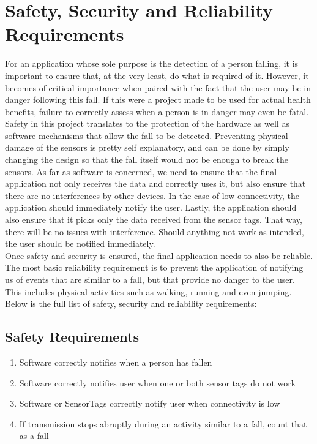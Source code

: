 \documentclass[conference,12pt]{IEEETran}
\begin{document}
\section{Safety, Security and Reliability Requirements}
	For an application whose sole purpose is the detection of a person falling, it is important to ensure that, at the very least, do what is required of it. However, it becomes of critical importance when paired with the fact that the user may be in danger following this fall. If this were a project made to be used for actual health benefits, failure to correctly assess when a person is in danger may even be fatal. Safety in this project translates to the protection of the hardware as well as software mechanisms that allow the fall to be detected. Preventing physical damage of the sensors is pretty self explanatory, and can be done by simply changing the design so that the fall itself would not be enough to break the sensors. As far as software is concerned, we need to ensure that the final application not only receives the data and correctly uses it, but also ensure that there are no interferences by other devices. In the case of low connectivity, the application should immediately notify the user. Lastly, the application should also ensure that it picks only the data received from the sensor tags. That way, there will be no issues with interference. Should anything not work as intended, the user should be notified immediately.\\
	Once safety and security is ensured, the final application needs to also be reliable. The most basic reliability requirement is to prevent the application of notifying us of events that are similar to a fall, but that provide no danger to the user. This includes physical activities such as walking, running and even jumping. Below is the full list of safety, security and reliability requirements:

\subsection{Safety Requirements}

	\begin{enumerate}
		\item Software correctly notifies when a person has fallen
		\item Software correctly notifies user when one or both sensor tags do not work
		\item Software or SensorTags correctly notify user when connectivity is low
		\item If transmission stops abruptly during an activity similar to a fall, count that as a fall
	\end{enumerate}
\end{document}
